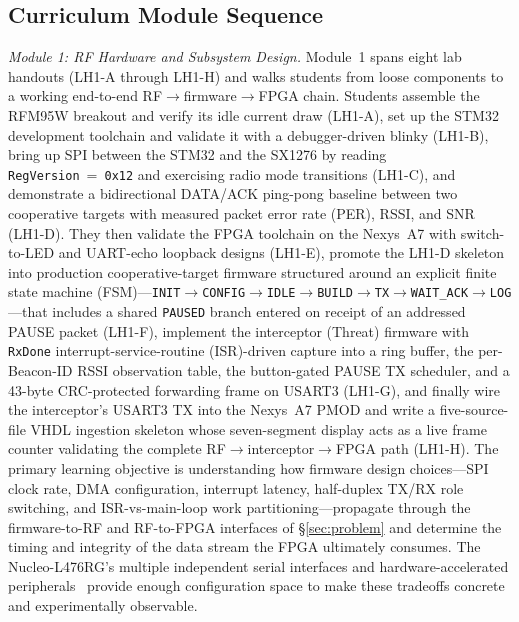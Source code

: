 \documentclass[conference]{IEEEtran}
\begin{document}
\subsection{Curriculum Module Sequence}

\textit{Module 1: RF Hardware and Subsystem Design.} Module~1 spans eight lab handouts (LH1-A through LH1-H) and walks students from loose components to a working end-to-end RF$\rightarrow$firmware$\rightarrow$FPGA chain. Students assemble the RFM95W breakout and verify its idle current draw (LH1-A), set up the STM32 development toolchain and validate it with a debugger-driven blinky (LH1-B), bring up SPI between the STM32 and the SX1276 by reading \texttt{RegVersion}~=~\texttt{0x12} and exercising radio mode transitions (LH1-C), and demonstrate a bidirectional DATA/ACK ping-pong baseline between two cooperative targets with measured packet error rate (PER), RSSI, and SNR (LH1-D). They then validate the FPGA toolchain on the Nexys~A7 with switch-to-LED and UART-echo loopback designs (LH1-E), promote the LH1-D skeleton into production cooperative-target firmware structured around an explicit finite state machine (FSM)---\texttt{INIT}$\rightarrow$\texttt{CONFIG}$\rightarrow$\texttt{IDLE}$\rightarrow$\texttt{BUILD}$\rightarrow$\texttt{TX}$\rightarrow$\texttt{WAIT\_ACK}$\rightarrow$\texttt{LOG}---that includes a shared \texttt{PAUSED} branch entered on receipt of an addressed PAUSE packet (LH1-F), implement the interceptor (Threat) firmware with \texttt{RxDone} interrupt-service-routine (ISR)-driven capture into a ring buffer, the per-Beacon-ID RSSI observation table, the button-gated PAUSE TX scheduler, and a 43-byte CRC-protected forwarding frame on USART3 (LH1-G), and finally wire the interceptor's USART3 TX into the Nexys~A7 PMOD and write a five-source-file VHDL ingestion skeleton whose seven-segment display acts as a live frame counter validating the complete RF$\rightarrow$interceptor$\rightarrow$FPGA path (LH1-H). The primary learning objective is understanding how firmware design choices---SPI clock rate, DMA configuration, interrupt latency, half-duplex TX/RX role switching, and ISR-vs-main-loop work partitioning---propagate through the firmware-to-RF and RF-to-FPGA interfaces of \S\ref{sec:problem} and determine the timing and integrity of the data stream the FPGA ultimately consumes. The Nucleo-L476RG's multiple independent serial interfaces and hardware-accelerated peripherals~\cite{b10} provide enough configuration space to make these tradeoffs concrete and experimentally observable.
\end{document}
